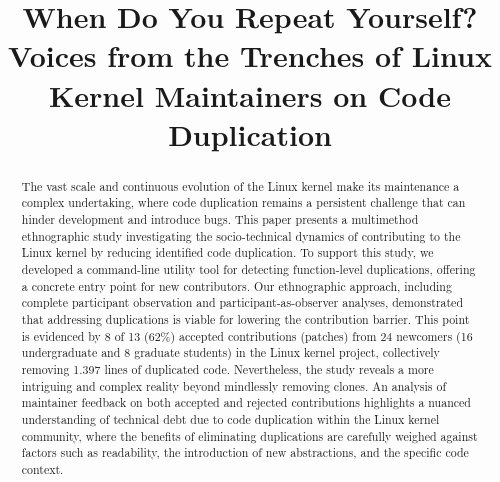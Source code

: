 \documentclass[10pt,conference]{IEEEtran}
\begin{document}
\title{When Do You Repeat Yourself?\\
Voices from the Trenches of Linux Kernel Maintainers on Code Duplication}



\author{}


\maketitle

\begin{abstract}
The vast scale and continuous evolution of the Linux kernel make its maintenance a complex undertaking, where code duplication remains a persistent challenge that can hinder development and introduce bugs. This paper presents a multimethod ethnographic study investigating the socio-technical dynamics of contributing to the Linux kernel by reducing identified code duplication. To support this study, we developed a command-line utility tool for detecting function-level duplications, offering a concrete entry point for new contributors. Our ethnographic approach, including complete participant observation and participant-as-observer analyses, demonstrated that addressing duplications is viable for lowering the contribution barrier. This point is evidenced by 8 of 13 (62\%) accepted contributions (patches) from 24 newcomers (16 undergraduate and 8 graduate students) in the Linux kernel project, collectively removing 1.397 lines of duplicated code. Nevertheless, the study reveals a more intriguing and complex reality beyond mindlessly removing clones. An analysis of maintainer feedback on both accepted and rejected contributions highlights a nuanced understanding of technical debt due to code duplication within the Linux kernel community, where the benefits of eliminating duplications are carefully weighed against factors such as readability, the introduction of new abstractions, and the specific code context.
\end{abstract}
\end{document}
